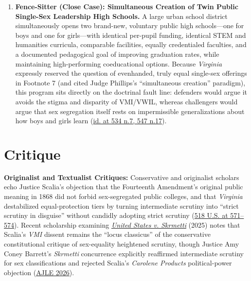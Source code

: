 \documentclass[12pt]{article}
\begin{document}
\begin{enumerate}
\item \textbf{Fence-Sitter (Close Case): Simultaneous Creation of Twin Public Single-Sex Leadership High Schools.} A large urban school district simultaneously opens two brand-new, voluntary public high schools---one for boys and one for girls---with identical per-pupil funding, identical STEM and humanities curricula, comparable facilities, equally credentialed faculties, and a documented pedagogical goal of improving graduation rates, while maintaining high-performing coeducational options. Because \textit{Virginia} expressly reserved the question of evenhanded, truly equal single-sex offerings in Footnote 7 (and cited Judge Phillips's ``simultaneous creation'' paradigm), this program sits directly on the doctrinal fault line: defenders would argue it avoids the stigma and disparity of VMI/VWIL, whereas challengers would argue that sex segregation itself rests on impermissible generalizations about how boys and girls learn (\href{https://supreme.justia.com/cases/federal/us/518/515/}{id. at 534 n.7, 547 n.17}).
\end{enumerate}

\section{Critique}
\textbf{Originalist and Textualist Critiques:} Conservative and originalist scholars echo Justice Scalia's objection that the Fourteenth Amendment's original public meaning in 1868 did not forbid sex-segregated public colleges, and that \textit{Virginia} destabilized equal-protection tiers by turning intermediate scrutiny into ``strict scrutiny in disguise'' without candidly adopting strict scrutiny (\href{https://www.law.cornell.edu/supct/html/94-1941.ZD.html}{518 U.S. at 571--574}). Recent scholarship examining \href{https://www.supremecourt.gov/opinions/24pdf/23-477_2cp3.pdf}{\textit{United States v. Skrmetti}} (2025) notes that Scalia's \textit{VMI} dissent remains the ``locus classicus'' of the conservative constitutional critique of sex-equality heightened scrutiny, though Justice Amy Coney Barrett's \textit{Skrmetti} concurrence explicitly reaffirmed intermediate scrutiny for sex classifications and rejected Scalia's \textit{Carolene Products} political-power objection (\href{https://direct.mit.edu/ajle/article/doi/10.1162/AJLE.a.107/139252/AMY-CONEY-BARRETT-S-SEX-EQUALITY-CONSTITUTION-The}{AJLE 2026}).
\end{document}
